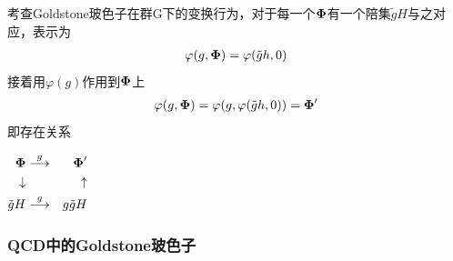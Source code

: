 \documentclass[aps,tightenlines,16pt]{ctexart}
\numberwithin{equation}{section}
\newcommand{\bm}[1]{\mbox{\boldmath{$#1$}}}
\begin{document}
考查Goldstone玻色子在群G下的变换行为，对于每一个$\bm{\Phi}$有一个陪集$\tilde{g}H$与之对应，表示为
\begin{align*}
   \varphi(g,\bm{\Phi})=\varphi(\tilde{g}h,0)
\end{align*}
接着用$\varphi(g)$作用到$\bm{\Phi}$上
\begin{align*}
   \varphi(g,\bm{\Phi})=\varphi(g,\varphi(\tilde{g}h,0))=\bm{\Phi}^{\prime}
\end{align*}
即存在关系
\begin{center}
\begin{math}
   \begin{aligned}
      \bm{\Phi} &\stackrel{g}{\longrightarrow} &\bm{\Phi}^{\prime}\\
      \downarrow &&\uparrow\\
      \tilde{g}H &\stackrel{g}{\longrightarrow}& g \tilde{g}H
   \end{aligned}
\end{math}
\end{center}

\subsubsection{QCD中的Goldstone玻色子}




















    
\newpage 

\renewcommand\refname{参考文献}




\end{document}
